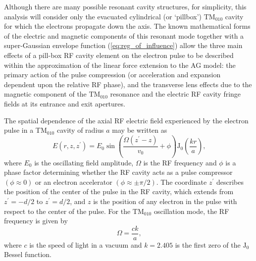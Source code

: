 Although there are many possible resonant cavity structures,\cite{oudheusden_electron_2007,humphries_principles_1986} for simplicity, this analysis will consider only the evacuated cylindrical (or `pillbox') $\text{TM}_{010}$ cavity for which the electrons propagate down the axis.\cite{fill_sub-fs_2006,humphries_principles_1986}
The known mathematical forms of the electric and magnetic components of this resonant mode together with a super-Gaussian envelope function (\ref{eq:reg_of_influence}) allow the three main effects of a pill-box RF cavity element on the electron pulse to be described within the approximation of the linear force extension to the AG model: the primary action of the pulse compression (or acceleration and expansion dependent upon the relative RF phase), and the transverse lens effects due to the magnetic component of the $\text{TM}_{010}$ resonance and the electric RF cavity fringe fields at its entrance and exit apertures.\cite{kim_rf_1989}

The spatial dependence of the axial RF electric field experienced by the electron pulse in a TM$_{010}$ cavity of radius $a$ may be written as
\begin{equation} \label{eq:RF_Efield}
  E ( r , z , z^{\prime} ) = E_{0} \sin \left ( \frac{ \Omega ( z^{\prime} - z ) }{ v_{{ \scriptscriptstyle 0}} } + \phi \right )\operatorname{J_{0}} \left ( \frac{ k r }{ a } \right ) \text{,}
\end{equation}
where $ E_{ 0 } $ is the oscillating field amplitude, $\Omega$ is the RF frequency and $\phi$ is a phase factor determining whether the RF cavity acts as a pulse compressor $ ( \phi \approx 0 ) $ or an electron accelerator $ ( \phi \approx \pm \pi/2 ) $.
The coordinate $z^{\prime} $ describes the position of the center of the pulse in the RF cavity, which extends from $ z^{\prime} = - d / 2 $ to $ z^{\prime} = d / 2 $, and $z$ is the position of any electron in the pulse with respect to the center of the pulse.
For the $\text{TM}_{010}$ oscillation mode, the RF frequency is given by
\begin{equation}
  \Omega = \frac{ c k }{a} \text{,}
\end{equation}
where $c$ is the speed of light in a vacuum and $ k = 2.405 $ is the first zero of the $\operatorname{ J_{0} }$ Bessel function.

